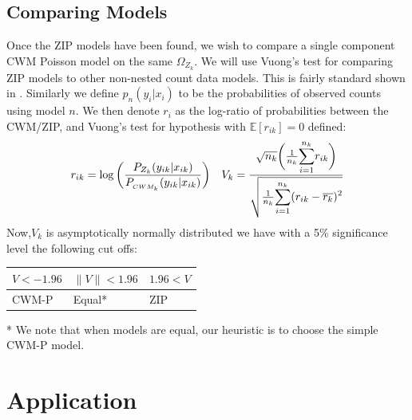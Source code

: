 \documentclass[11pt,letterpaper]{article}
\numberwithin{equation}{section}
\numberwithin{equation}{section}
\numberwithin{equation}{section}
\begin{document}
\subsection{Comparing Models}

Once the ZIP models have been found, we wish to compare a single component CWM Poisson model on the same $\Omega_{Z_k}$. We will use Vuong's test for comparing ZIP models to other non-nested count data models. This is fairly standard shown in \cite{EzzahidEuro}. %
Similarly we define $p_n(y_{i}|x_{i})$ to be the probabilities of observed counts using model $n$. We then denote $r_i$ as the log-ratio of probabilities between the CWM/ZIP, and   Vuong's test for hypothesis with $\mathbb{E} [r_{ik}] = 0 $ defined: 
\begin{align*}
 r_{ik} = \log \bigg( \frac{P_{Z_k}(y_{ik}|x_{ik})}{P_{ _{CWM_k}}(y_{ik}|x_{ik})} \bigg) && 
V_k = \frac{  \sqrt{n_k}  \bigg(\frac{1}{n_k} \mathlarger{  \sum_{i=1}^{n_k} } r_{ik}    \bigg)    }{\sqrt{ \frac{1}{n_k}  \mathlarger{  \sum_{i=1}^{n_k} ( r_{ik} -    \overline{r_k} )^2  }}} 
\end{align*}
Now,$V_k$ is asymptotically normally distributed we have with a 5\% significance level the following cut offs:
\begin{center}
\begin{tabular}{lll}
\hline
$ V < -1.96$ & $ \|V \|  < 1.96$ & $ 1.96 < V $ \\
\hline
CWM-P             & Equal*           & ZIP             \\
\hline
\end{tabular}
\end{center}
* We note that when models are equal, our heuristic is to choose the simple CWM-P model.%

\section{Application}
\end{document}
